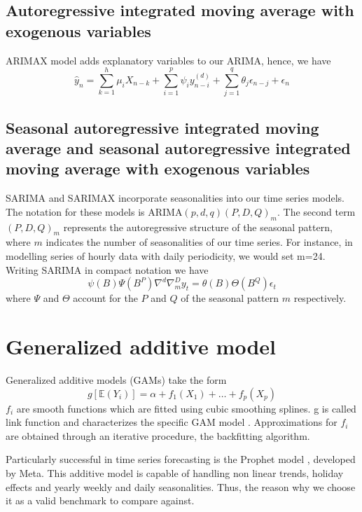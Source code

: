 \subsection{Autoregressive integrated moving average with exogenous variables}
ARIMAX model adds explanatory variables to our ARIMA, hence, we have
\begin{equation}
    \hat{y}_n=\sum\limits_{k=1}^{h} \mu_i X_{n-k}+\sum\limits_{i=1}^{p}\psi_i y_{n-i}^{(d)}+\sum\limits_{j=1}^{q}\theta_j \epsilon_{n-j}+ \epsilon_{n}
\end{equation}
\subsection{Seasonal autoregressive integrated moving average and seasonal autoregressive integrated moving average with exogenous variables}
SARIMA and SARIMAX incorporate seasonalities into our time series models. The notation for these models is ARIMA$(p,d,q)(P,D,Q)_m$. The second term $(P,D,Q)_m$ represents the autoregressive structure of the seasonal pattern, where $m$ indicates the number of seasonalities of our time series.
For instance, in modelling series of hourly data with daily periodicity, we would set m=24.
Writing SARIMA in compact notation we have
\\
\begin{equation}
    \psi(B)\Psi(B^P)\nabla^d\nabla_m^Dy_t=\theta(B)\Theta(B^Q)\epsilon_t
\end{equation}
where $\Psi$ and $\Theta$ account for the $P$ and $Q$ of the seasonal pattern $m$ respectively.
\section{Generalized additive model}
Generalized additive models (GAMs) take the form
\begin{equation}
    g[\mathbb{E}(Y_i)]=\alpha+f_1(X_1)+\dots+f_p(X_p)
\end{equation}
$f_i$ are smooth functions which are fitted using cubic smoothing splines.
g is called link function and characterizes the specific GAM model \cite{hastie2017generalized}. Approximations for $f_i$ are obtained through an iterative procedure, the backfitting algorithm.

Particularly successful in time series forecasting is the Prophet model \cite{taylor2018forecasting}, developed by Meta. This additive model is capable of handling non linear trends, holiday effects and yearly weekly and daily seasonalities. Thus, the reason why we choose it as a valid benchmark to compare against.

